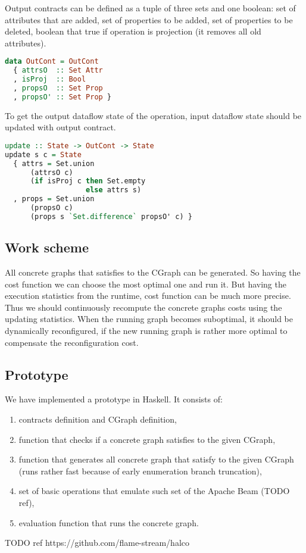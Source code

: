 Output contracts can be defined as a tuple of three sets and one boolean:
set of attributes that are added,
set of properties to be added,
set of properties to be deleted,
boolean that true if operation is projection (it removes all old attributes).

\begin{lstlisting}[language=Haskell]
data OutCont = OutCont
  { attrsO  :: Set Attr
  , isProj  :: Bool
  , propsO  :: Set Prop
  , propsO' :: Set Prop }
\end{lstlisting}

To get the output dataflow state of the operation, input dataflow state should be updated with output contract.

\begin{lstlisting}[language=Haskell]
update :: State -> OutCont -> State
update s c = State
  { attrs = Set.union
      (attrsO c)
      (if isProj c then Set.empty
                   else attrs s)
  , props = Set.union
      (propsO c)
      (props s `Set.difference` propsO' c) }
\end{lstlisting}

\subsection{Work scheme}

All concrete graphs that satisfies to the CGraph can be generated.
So having the cost function we can choose the most optimal one and run it.
But having the execution statistics from the runtime, cost function can be much more precise.
Thus we should continuously recompute the concrete graphs costs using the updating statistics.
When the running graph becomes suboptimal, it should be dynamically reconfigured, if the new running graph is rather more optimal to compensate the reconfiguration cost.

\subsection{Prototype}

We have implemented a prototype in Haskell.
It consists of:
\begin{enumerate}
    \item contracts definition and CGraph definition,
    \item function that checks if a concrete graph satisfies to the given CGraph,
    \item function that generates all concrete graph that satisfy to the given CGraph (runs rather fast because of early enumeration branch truncation),
    \item set of basic operations that emulate such set of the Apache Beam (TODO ref),
    \item evaluation function that runs the concrete graph.
\end{enumerate}

TODO ref https://github.com/flame-stream/halco
